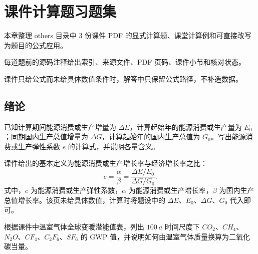 \chapter{课件计算题习题集}

\begin{introduction}
\item 本章整理 others 目录中 3 份课件 PDF 的显式计算题、课堂计算例和可直接改写为题目的公式应用。
\item 每道题前的源码注释给出索引、来源文件、PDF 页码、课件小节和核对状态。
\item 课件只给公式而未给具体数值条件时，解答中只保留公式路径，不补造数据。
\end{introduction}

\section{绪论}

\begin{problem}[能源消费或生产弹性系数]\label{exer:calc_01_intro_p041_01}
已知计算期间能源消费或生产增量为 \(\Delta E\)，计算起始年的能源消费或生产量为 \(E_0\)；同期国内生产总值增量为 \(\Delta G\)，计算起始年的国内生产总值为 \(G_0\)。写出能源消费或生产弹性系数 \(e\) 的计算式，并说明各量含义。
\end{problem}

\begin{solution}
课件给出的基本定义为能源消费或生产增长率与经济增长率之比：
\begin{equation}
e = \frac{\alpha}{\beta}
  = \frac{\Delta E / E_0}{\Delta G / G_0}.
\end{equation}
式中，\(e\) 为能源消费或生产弹性系数，\(\alpha\) 为能源消费或生产增长率，\(\beta\) 为国内生产总值增长率。该页未给具体数值，计算时将题设中的 \(\Delta E\)、\(E_0\)、\(\Delta G\)、\(G_0\) 代入即可。
\end{solution}

\begin{problem}[温室气体全球变暖潜能值查表]\label{exer:calc_01_intro_p087_01}
根据课件中温室气体全球变暖潜能值表，列出 \(\qty{100}{a}\) 时间尺度下 \(CO_2\)、\(CH_4\)、\(N_2O\)、\(CF_4\)、\(C_2F_6\)、\(SF_6\) 的 GWP 值，并说明如何由温室气体质量换算为二氧化碳当量。
\end{problem}

